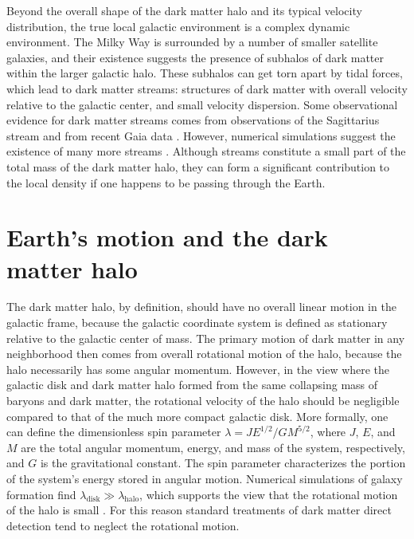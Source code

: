 Beyond the overall shape of the dark matter halo and its typical velocity distribution, the true local galactic environment is a complex dynamic environment. The Milky Way is surrounded by a number of smaller satellite galaxies, and their existence suggests the presence of subhalos of dark matter within the larger galactic halo. These subhalos can get torn apart by tidal forces, which lead to dark matter streams: structures of dark matter with overall velocity relative to the galactic center, and small velocity dispersion. Some observational evidence for dark matter streams comes from observations of the Sagittarius stream \parencite{BelokurovEtAl2013} and from recent Gaia data \parencite{NecibLisantiBelokurov2019}. However, numerical simulations suggest the existence of many more streams \parencite{HelmiWhiteSpringel2002}. Although streams constitute a small part of the total mass of the dark matter halo, they can form a significant contribution to the local density if one happens to be passing through the Earth.

\section{Earth's motion and the dark matter halo}

The dark matter halo, by definition, should have no overall linear motion in the galactic frame, because the galactic coordinate system is defined as stationary relative to the galactic center of mass. The primary motion of dark matter in any neighborhood then comes from overall rotational motion of the halo, because the halo necessarily has some angular momentum. However, in the view where the galactic disk and dark matter halo formed from the same collapsing mass of baryons and dark matter, the rotational velocity of the halo should be negligible compared to that of the much more compact galactic disk. More formally, one can define the dimensionless spin parameter $\lambda=JE^{1/2}/GM^{5/2}$, where $J$, $E$, and $M$ are the total angular momentum, energy, and mass of the system, respectively, and $G$ is the gravitational constant. The spin parameter characterizes the portion of the system's energy stored in angular motion. Numerical simulations of galaxy formation find $\lambda_\text{disk}\gg\lambda_\text{halo}$, which supports the view that the rotational motion of the halo is small \parencites{MoMaoWhite1998, WarrenEtAl1992, KimmEtAl2011}. For this reason standard treatments of dark matter direct detection tend to neglect the rotational motion.


